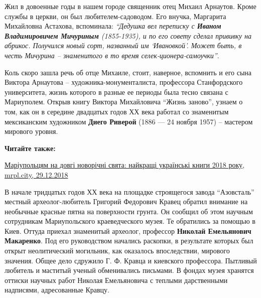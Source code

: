
Жил в довоенные годы в нашем городе священник отец Михаил Арнаутов. Кроме
службы в церкви, он был любителем-садоводом. Его внучка, Маргарита Михайловна
Астахова, вспоминала: \emph{\enquote{Дедушка вел переписку с \textbf{Иваном Владимировичем Мичуриным}
(1855-1935), и по его совету сделал прививку на абрикос. Получился новый сорт,
названный им \enquote{Ивановкой}. Может быть, в честь Мичурина – знаменитого в то время
селек\hyp{}ционера-самоучки}}.


Коль скоро зашла речь об отце Михаиле, стоит, наверное, вспомнить и его сына
Виктора Арнаутова – художника-монументалиста, профессора Станфордского
университета, жизнь которого в разные ее периоды была тесно связана с
Мариуполем. Открыв книгу Виктора Михайловича \enquote{Жизнь заново}, узнаем о
том, как он в середине двадцатых годов ХХ века работал со знаменитым
мексиканским художником \textbf{Диего Риверой} (1886 — 24 ноября 1957) – мастером
мирового уровня.


\textbf{Читайте также:} 

\href{https://mrpl.city/news/view/mariupoltsyam-na-dovgi-novorichni-svyata-najkrashhi-ukrainski-knigi-2018-go-roku}{%
Маріупольцям на довгі новорічні свята: найкращі українські книги 2018 року, mrpl.city, 29.12.2018}


В начале тридцатых годов ХХ века на площадке строящегося завода \enquote{Азовсталь}
местный археолог-любитель Григорий Федорович Кравец обратил внимание на
необычные красные пятна на поверхности грунта. Он сообщил об этом научным
сотрудникам Мариупольского краеведческого музея. Те обратились за помощью в
Киев. Оттуда приехал знаменитый археолог, профессор \textbf{Николай Емельянович
Макаренко}. Под его руководством начались раскопки, в результате которых был
открыт неолитический могильник, как оказалось впоследствии, мирового значения.
Общее дело сдружило Г. Ф. Кравца и киевского профессора. Пытливый любитель и
маститый ученый обменивались письмами. В фондах музея хранятся оттиски научных
работ Николая Емельяновича с теплыми дарственными надписями, адресованные
Кравцу.

